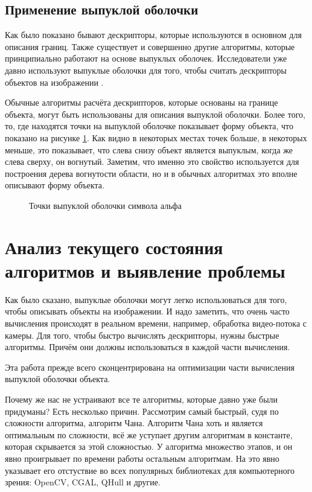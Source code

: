 \subsection{Применение выпуклой оболочки}

Как было показано бывают дескрипторы, которые используются в основном для описания границ. Также существует и совершенно другие алгоритмы, которые принципиально работают на основе выпуклых оболочек. Исследователи уже давно используют выпуклые оболочки для того, чтобы считать дескрипторы объектов на изображении \cite{dalitz2013fourier, mathew2015content, sonka2014image}.

Обычные алгоритмы расчёта дескрипторов, которые основаны на границе объекта, могут быть использованы для описания выпуклой оболочки. Более того, то, где находятся точки на выпуклой оболочке показывает форму объекта, что показано на рисунке \ref{img:alpha_convex_hull}. Как видно в некоторых местах точек больше, в некоторых меньше, это показывает, что слева снизу объект является выпуклым, когда же слева сверху, он вогнутый. Заметим, что именно это свойство используется для построения дерева вогнутости области, но и в обычных алгоритмах это вполне описывают форму объекта.

\begin{figure}[H]
	\centering
	
	\caption{Точки выпуклой оболочки символа альфа}
	\label{img:alpha_convex_hull}
\end{figure}

\section{Анализ текущего состояния алгоритмов и выявление проблемы} \label{sect1_2}

Как было сказано, выпуклые оболочки могут легко использоваться для того, чтобы описывать объекты на изображении. И надо заметить, что очень часто вычисления происходят в реальном времени, например, обработка видео-потока с камеры. Для того, чтобы быстро вычислять дескрипторы, нужны быстрые алгоритмы. Причём они должны использоваться в каждой части вычисления.

Эта работа прежде всего сконцентрирована на оптимизации части вычисления выпуклой оболочки объекта.

Почему же нас не устраивают все те алгоритмы, которые давно уже были придуманы? Есть несколько причин. Рассмотрим самый быстрый, судя по сложности алгоритма, алгоритм Чана. Алгоритм Чана хоть и является оптимальным по сложности, всё же уступает другим алгоритмам в константе, которая скрывается за этой сложностью. У алгоритма множество этапов, и он явно проигрывает по времени работы остальным алгоритмам. На это явно указывает его отстуствие во всех популярных библиотеках для компьютерного зрения: OpenCV\cite{opencvconvexhull}, CGAL\cite{cgalconvexhull}, QHull\cite{qhull} и другие.

